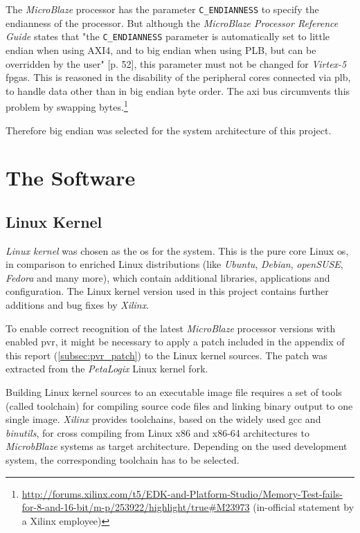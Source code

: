 The \textit{MicroBlaze} processor has the parameter \texttt{C\_ENDIANNESS} to specify the endianness of the processor. But although the \textit{MicroBlaze Processor Reference Guide} states that "the \texttt{C\_ENDIANNESS} parameter is automatically set to little endian when using AXI4, and to big endian when using PLB, but can be overridden by the user" \cite{mb_ref}[p. 52], this parameter must not be changed for \textit{Virtex-5} \gls{fpga}s. This is reasoned in the disability of the peripheral cores connected via \gls{plb}, to handle data other than in big endian byte order. The \gls{axi} bus circumvents this problem by swapping bytes.\footnote{\url{http://forums.xilinx.com/t5/EDK-and-Platform-Studio/Memory-Test-fails-for-8-and-16-bit/m-p/253922/highlight/true\#M23973} (in-official statement by a Xilinx employee)}

Therefore big endian was selected for the system architecture of this project.

\clearpage
\section{The Software}

\subsection{Linux Kernel}

\textit{Linux kernel} was chosen as the \gls{os} for the system. This is the pure core Linux \gls{os}, in comparison to enriched Linux distributions (like \textit{Ubuntu}, \textit{Debian}, \textit{openSUSE}, \textit{Fedora} and many more), which contain additional libraries, applications and configuration. The Linux kernel version used in this project contains further additions and bug fixes by \textit{Xilinx}.

To enable correct recognition of the latest \textit{MicroBlaze} processor versions with enabled \gls{pvr}, it might be necessary to apply a patch included in the appendix of this report (\ref{subsec:pvr_patch}) to the Linux kernel sources. The patch was extracted from the \textit{PetaLogix} Linux kernel fork.

Building Linux kernel sources to an executable image file requires a set of tools (called toolchain) for compiling source code files and linking binary output to one single image. \textit{Xilinx} provides toolchains, based on the widely used \gls{gcc} and \textit{binutils}, for cross compiling from Linux x86 and x86-64 architectures to \textit{MicrobBlaze} systems as target architecture. Depending on the used development system, the corresponding toolchain has to be selected.

